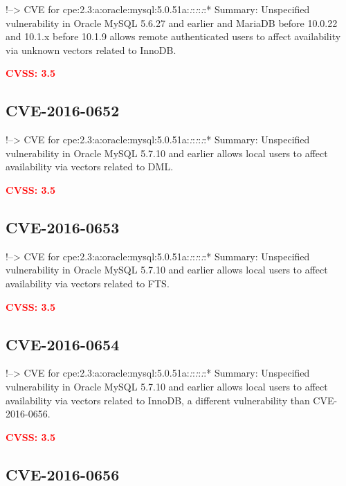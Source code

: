 \documentclass[a4paper, 12pt]{article}
\begin{document}
!--\textgreater{} CVE for
cpe:2.3:a:oracle:mysql:5.0.51a:\emph{:}:\emph{:}:\emph{:}:* Summary:
Unspecified vulnerability in Oracle MySQL 5.6.27 and earlier and MariaDB
before 10.0.22 and 10.1.x before 10.1.9 allows remote authenticated
users to affect availability via unknown vectors related to InnoDB.

\textbf{\textcolor{red}{CVSS: 3.5}}

\hypertarget{cve-2016-0652}{%
\subsection{CVE-2016-0652}\label{cve-2016-0652}}

!--\textgreater{} CVE for
cpe:2.3:a:oracle:mysql:5.0.51a:\emph{:}:\emph{:}:\emph{:}:* Summary:
Unspecified vulnerability in Oracle MySQL 5.7.10 and earlier allows
local users to affect availability via vectors related to DML.

\textbf{\textcolor{red}{CVSS: 3.5}}

\hypertarget{cve-2016-0653}{%
\subsection{CVE-2016-0653}\label{cve-2016-0653}}

!--\textgreater{} CVE for
cpe:2.3:a:oracle:mysql:5.0.51a:\emph{:}:\emph{:}:\emph{:}:* Summary:
Unspecified vulnerability in Oracle MySQL 5.7.10 and earlier allows
local users to affect availability via vectors related to FTS.

\textbf{\textcolor{red}{CVSS: 3.5}}

\hypertarget{cve-2016-0654}{%
\subsection{CVE-2016-0654}\label{cve-2016-0654}}

!--\textgreater{} CVE for
cpe:2.3:a:oracle:mysql:5.0.51a:\emph{:}:\emph{:}:\emph{:}:* Summary:
Unspecified vulnerability in Oracle MySQL 5.7.10 and earlier allows
local users to affect availability via vectors related to InnoDB, a
different vulnerability than CVE-2016-0656.

\textbf{\textcolor{red}{CVSS: 3.5}}

\hypertarget{cve-2016-0656}{%
\subsection{CVE-2016-0656}\label{cve-2016-0656}}
\end{document}
